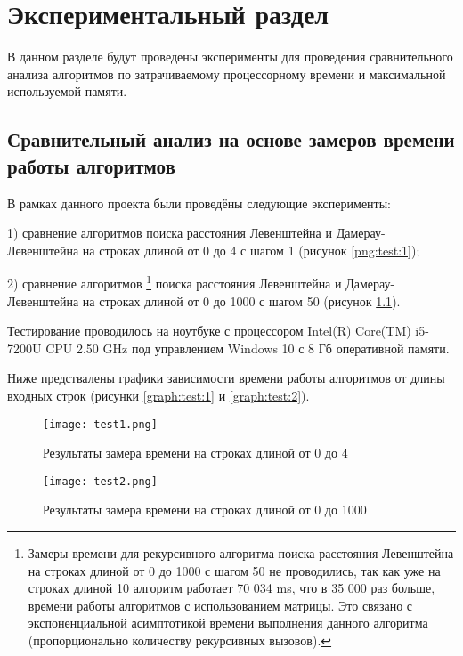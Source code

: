 \chapter{Экспериментальный раздел}
\label{cha:research}
    В данном разделе будут проведены эксперименты для проведения 
    сравнительного анализа алгоритмов по затрачиваемому процессорному 
    времени\cite{CPU-time} и максимальной используемой памяти.
    \section{Сравнительный анализ на основе замеров времени работы алгоритмов}
        В рамках данного проекта были проведёны следующие эксперименты:

        1) сравнение алгоритмов поиска расстояния Левенштейна и Дамерау-Левенштейна
        на строках длиной от 0 до 4 с шагом 1 (рисунок \ref{png:test:1});
        
        2) сравнение алгоритмов \footnote{Замеры времени для рекурсивного алгоритма поиска расстояния Левенштейна
        на строках длиной от 0 до 1000 с шагом 50 не проводились, так как уже на 
        строках длиной 10 алгоритм работает 70 034 ms, что в 35 000 раз больше, 
        времени работы алгоритмов с использованием матрицы. Это связано с экспоненциальной асимптотикой
        времени выполнения данного алгоритма (пропорционально количеству
        рекурсивных вызовов).} поиска расстояния Левенштейна и Дамерау-Левенштейна
        на строках длиной от 0 до 1000 с шагом 50 (рисунок \ref{png:test:2}).
        
        Тестирование проводилось на ноутбуке с процессором
        Intel(R) Core(TM) i5-7200U CPU 2.50 GHz \cite{processor-i5-7200u}
        под управлением Windows 10 с 8 Гб оперативной памяти.

        Ниже предствалены графики зависимости времени работы алгоритмов от длины входных строк
        (рисунки \ref{graph:test:1} и \ref{graph:test:2}).

        \begin{figure}[h!]
            \centering
            \texttt{[image: test1.png]}
            \caption{Результаты замера времени на строках длиной от 0 до 4}
            \label{png:test:1}
        
            \texttt{[image: test2.png]}
            \caption{Результаты замера времени на строках длиной от 0 до 1000}
            \label{png:test:2}
        \end{figure}
    
